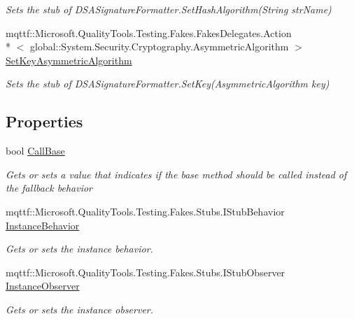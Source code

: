 \begin{DoxyCompactItemize}
\begin{DoxyCompactList}\small\item\em Sets the stub of D\-S\-A\-Signature\-Formatter.\-Set\-Hash\-Algorithm(\-String str\-Name)\end{DoxyCompactList}\item 
mqttf\-::\-Microsoft.\-Quality\-Tools.\-Testing.\-Fakes.\-Fakes\-Delegates.\-Action\\*
$<$ global\-::\-System.\-Security.\-Cryptography.\-Asymmetric\-Algorithm $>$ \hyperlink{class_system_1_1_security_1_1_cryptography_1_1_fakes_1_1_stub_d_s_a_signature_formatter_a8317eecdfa411e03aa20a329624d6a6f}{Set\-Key\-Asymmetric\-Algorithm}
\begin{DoxyCompactList}\small\item\em Sets the stub of D\-S\-A\-Signature\-Formatter.\-Set\-Key(\-Asymmetric\-Algorithm key)\end{DoxyCompactList}\end{DoxyCompactItemize}
\subsection*{Properties}
\begin{DoxyCompactItemize}
\item 
bool \hyperlink{class_system_1_1_security_1_1_cryptography_1_1_fakes_1_1_stub_d_s_a_signature_formatter_a949eefd33ad74b4c4c0eaaf3330b27c8}{Call\-Base}
\begin{DoxyCompactList}\small\item\em Gets or sets a value that indicates if the base method should be called instead of the fallback behavior\end{DoxyCompactList}\item 
mqttf\-::\-Microsoft.\-Quality\-Tools.\-Testing.\-Fakes.\-Stubs.\-I\-Stub\-Behavior \hyperlink{class_system_1_1_security_1_1_cryptography_1_1_fakes_1_1_stub_d_s_a_signature_formatter_a5e3b2f47a85d7c34eb640652b68db945}{Instance\-Behavior}
\begin{DoxyCompactList}\small\item\em Gets or sets the instance behavior.\end{DoxyCompactList}\item 
mqttf\-::\-Microsoft.\-Quality\-Tools.\-Testing.\-Fakes.\-Stubs.\-I\-Stub\-Observer \hyperlink{class_system_1_1_security_1_1_cryptography_1_1_fakes_1_1_stub_d_s_a_signature_formatter_a633c09b7625f7c979a27f75087bb0048}{Instance\-Observer}
\begin{DoxyCompactList}\small\item\em Gets or sets the instance observer.\end{DoxyCompactList}\end{DoxyCompactItemize}



